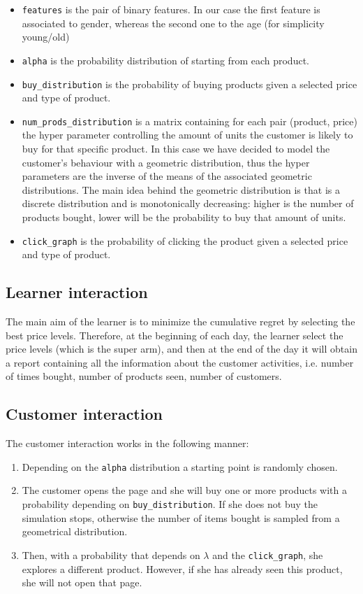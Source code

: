 \begin{itemize}
    \item \verb|features| is the pair of binary features. In our case the first feature is associated to gender, whereas the second one to the age (for simplicity young/old)
    \item \verb|alpha| is the probability distribution of starting from each product.
    \item \verb|buy_distribution| is the probability of buying products given a selected price and type of product.
    \item \verb|num_prods_distribution| is a matrix containing for each pair (product, price) the hyper parameter controlling the amount of units the customer is likely to buy for that specific product. In this case we have decided to model the customer's behaviour with a geometric distribution, thus the hyper parameters are the inverse of the means of the associated geometric distributions.
    The main idea behind the geometric distribution is that is a discrete distribution and is monotonically decreasing: higher is the number of products bought, lower will be the probability to buy that amount of units.
    \item \verb|click_graph| is the probability of clicking the product given a selected price and type of product.
\end{itemize}

\subsection{Learner interaction}
The main aim of the learner is to minimize the cumulative regret by selecting the best price levels.
Therefore, at the beginning of each day, the learner select the price levels (which is the super arm), and then at the end of the day it will obtain a report containing all the information about the customer activities, i.e. number of times bought, number of products seen, number of customers.


\subsection{Customer interaction}
The customer interaction works in the following manner:
\begin{enumerate}
    \item Depending on the \verb|alpha| distribution a starting point is randomly chosen.
    \item The customer opens the page and she will buy one or more products with a probability depending on \verb|buy_distribution|. If she does not buy the simulation stops, otherwise the number of items bought is sampled from a geometrical distribution.
    \item Then, with a probability that depends on \(\lambda\) and the \verb|click_graph|, she explores a different product. However, if she has already seen this product, she will not open that page.
\end{enumerate}

